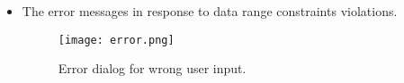 \begin{itemize}
\begin{itemize}
\item{ The error messages in response to data range constraints violations.}
\begin{figure}
\centerline{\texttt{[image: error.png]}}
\caption{Error dialog for wrong user input.}
\end{figure}	
\end{itemize}
\end{itemize}


